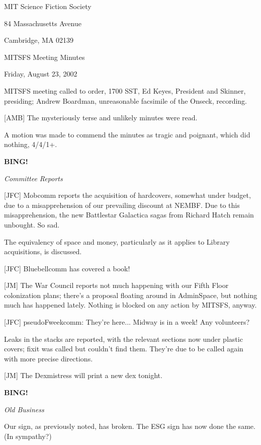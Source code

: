 \documentclass[12pt]{article}
\newcommand{\bing}{{\bf BING!} }
\newcommand{\goto}[1]{\bing \vskip 12pt \centerline{{\em{#1}}}}
\begin{document}
\begin{center}

MIT Science Fiction Society 

84 Massachusetts Avenue

Cambridge, MA 02139

\vspace{12pt}

MITSFS Meeting Minutes 

Friday, August 23, 2002

\end{center}
 
\vspace{18pt}

\setlength{\parskip}{6pt}

\noindent
MITSFS meeting called to order, 1700 SST, Ed Keyes, President and Skinner, presiding; Andrew Boardman, unreasonable facsimile of the Onseck, recording.

[AMB] The mysteriously terse and unlikely minutes were read.

A motion was made to commend the minutes as tragic and poignant, which did nothing, 4/4/1+.

\goto{Committee Reports}

[JFC] Mobcomm reports the acquisition of hardcovers, somewhat under budget, due to a misapprehension of our prevailing discount at NEMBF. Due to this misapprehension, the new Battlestar Galactica sagas from Richard Hatch remain unbought. So sad.

The equivalency of space and money, particularly as it applies to Library acquisitions, is discussed.

[JFC] Bluebellcomm has covered a book!

[JM] The War Council reports not much happening with our Fifth Floor colonization plans; there's a proposal floating around in AdminSpace, but nothing much has happened lately. Nothing is blocked on any action by MITSFS, anyway.

[JFC] pseudoFweekcomm: They're here... Midway is in a week! Any volunteers?

Leaks in the stacks are reported, with the relevant sections now under plastic covers; fixit was called but couldn't find them. They're due to be called again with more precise directions.

[JM] The Dexmistress will print a new dex tonight.

\goto{Old Business}

Our sign, as previously noted, has broken.  The ESG sign has now done the same. (In sympathy?)
\end{document}
